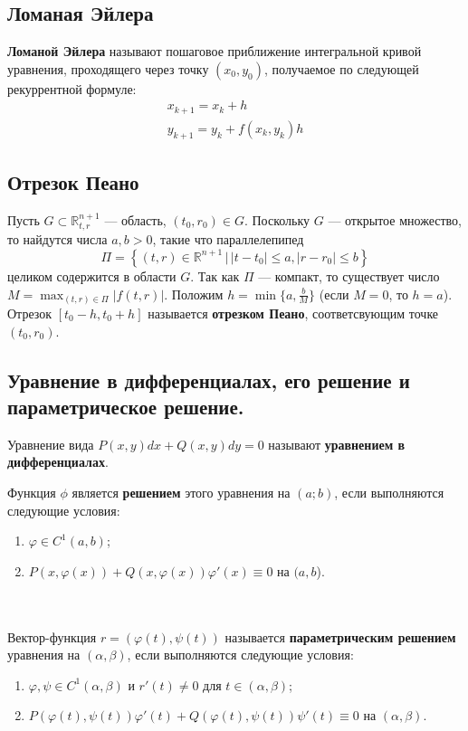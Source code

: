 \documentclass{article}
\begin{document}
\subsection{Ломаная Эйлера}
\textbf{Ломаной Эйлера} называют пошаговое приближение интегральной кривой уравнения, проходящего через точку $(x_0, y_0)$, получаемое по следующей рекуррентной формуле: 
\begin{gather*}
    x_{k+1} = x_k + h\\
    y_{k+1} = y_k + f(x_k, y_k)h
\end{gather*}

\subsection{Отрезок Пеано}
Пусть $G \subset \mathbb{R}_{t,r}^{n+1}$ --- область, $(t_0, r_0) \in G$. Поскольку $G$ --- открытое множество, то найдутся числа $a,b > 0$, такие что параллелепипед
\begin{equation*}
    \Pi = \left\{(t,r) \in \mathbb{R}^{n+1}\,|\, |t-t_0| \le a, |r-r_0|\le b \right\}
\end{equation*}
целиком содержится в области $G$. Так как $\Pi$ --- компакт, то существует число $M = \displaystyle\max_{(t,r)\in \Pi} |f(t,r)|$. Положим $h = \min \{a, \frac{b}{M}\}$ (если $M = 0$, то $h = a$). Отрезок $[t_0 - h, t_0 + h]$ называется \textbf{отрезком Пеано}, соответсвующим точке $(t_0, r_0)$.

\subsection{Уравнение в дифференциалах, его решение и параметрическое решение.}
Уравнение вида $P(x, y)dx + Q(x, y)dy = 0$ называют \textbf{уравнением в дифференциалах}.

Функция $\phi$ является \textbf{решением} этого уравнения на $(a; b)$, если выполняются следующие условия:
\begin{enumerate}
    \item $\varphi \in C^1(a, b)$;
    \item $P(x, \varphi(x)) + Q(x, \varphi(x))\varphi'(x) \equiv 0$ на $(a, b$).
\end{enumerate}
\\\\Вектор-функция $r = (\varphi(t), \psi(t))$ называется \textbf{параметрическим решением} уравнения на $(\alpha, \beta)$, если выполняются следующие условия:
\begin{enumerate}
    \item $\varphi, \psi \in C^1(\alpha, \beta)$ и $r'(t) \neq 0$ для $t \in (\alpha, \beta)$;
    \item $P(\varphi(t), \psi(t))\varphi'(t) + Q(\varphi(t), \psi(t))\psi'(t) \equiv 0$ на $(\alpha, \beta)$.
\end{enumerate}
\end{document}
